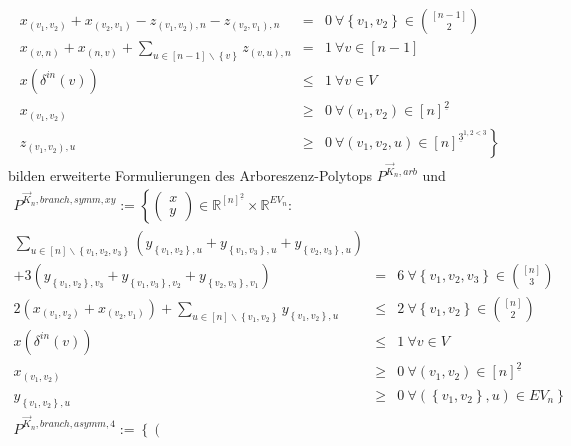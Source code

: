 \documentclass[10p,a4paper,BCOR = 12mm, DIV=15]{scrbook}
\begin{document}
\begin{Kor}
\begin{eqnarray*}
x_{\left(v_1, v_2\right)} + x_{\left(v_2, v_1\right)} - z_{\left(v_1, v_2\right), n} - z_{\left(v_2, v_1\right), n} & = & 0\ \forall \left\{v_1, v_2\right\}\in {\left[n-1\right] \choose 2} \\
x_{\left(v, n\right)} + x_{\left(n, v\right)} + \sum_{u\in[n-1]\backslash\left\{v\right\}} z_{\left(v, u\right), n} & = & 1\ \forall v \in [n-1] \\
x\left(\delta^{in}\left(v\right)\right) & \leq & 1 \ \forall v \in V \\
x_{\left(v_1, v_2\right)} & \geq & 0 \ \forall \left(v_1, v_2\right) \in \left[n\right]^{\underline{2}} \nonumber \\
z_{\left(v_1, v_2\right), u} & \geq & 0\nonumber \left. \ \forall \left(v_1, v_2, u\right) \in \left[n\right]^{\underline{3}^{1, 2 < 3}}\right\}
\end{eqnarray*}
bilden erweiterte Formulierungen des Arboreszenz-Polytops $P^{\vec{K}_n, arb}$ und
\begin{eqnarray*}
P^{\vec{K}_n, branch, symm, xy} := \left\{ \left(\begin{array}{c}
x \\
y
\end{array}\right)\in\mathbb{R}^{[n]^{\underline{2}}}\times \mathbb{R}^{EV_n}: \right.
\nonumber & & \\
\sum_{u \in \left[n\right] \backslash \left\{v_1, v_2, v_3\right\}} \left(y_{\left\{v_1, v_2\right\}, u} + y_{\left\{v_1, v_3\right\}, u} + y_{\left\{v_2, v_3\right\}, u}\right) & & \nonumber \\
+ 3 \left(y_{\left\{v_1, v_2\right\}, v_3} + y_{\left\{v_1, v_3\right\}, v_2} + y_{\left\{v_2, v_3\right\}, v_1}\right) & = & 6 \ \forall \left\{v_1, v_2, v_3\right\}\in {[n] \choose 3} \\
2 \left(x_{\left(v_1, v_2\right)} + x_{\left(v_2, v_1\right)}\right) + \sum_{u\in[n]\backslash\left\{v_1, v_2\right\}} y_{\left\{v_1, v_2\right\}, u} & \leq & 2\ \forall \left\{v_1, v_2\right\}\in {[n] \choose 2} \\
x\left(\delta^{in}\left(v\right)\right) & \leq & 1 \ \forall v \in V \\
x_{\left(v_1, v_2\right)} & \geq & 0 \ \forall \left(v_1, v_2\right) \in \left[n\right]^{\underline{2}} \nonumber \\
y_{\left\{v_1, v_2\right\}, u} & \geq & 0\nonumber \left. \ \forall \left(\left\{v_1, v_2\right\}, u\right) \in EV_n \right\} \\
P^{\vec{K}_n, branch, asymm, 4} := \left\{
\left(\begin{array}{c}

\end{array}
\end{eqnarray*}
\end{Kor}
\end{document}
